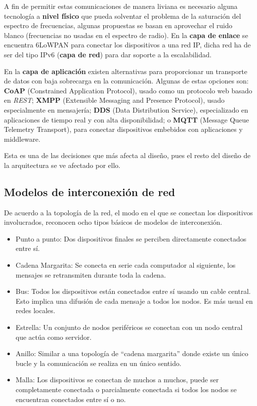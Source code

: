 \documentclass[a4paper,10pt]{article}
\begin{document}
A fin de permitir estas comunicaciones de manera liviana es necesario
alguna tecnología a \textbf{nivel físico} que pueda solventar el
problema de la saturación del espectro de frecuencias, algunas
propuestas se basan en aprovechar el ruido blanco (frecuencias no
usadas en el espectro de radio)\cite{tempertonTVWhiteSpace2015}.  En
la \textbf{capa de enlace} se encuentra 6LoWPAN
\cite{schumacherIPv6LowPowerWireless} para conectar los dispositivos a
una red IP, dicha red ha de ser del tipo IPv6 (\textbf{capa de red})
para dar soporte a la escalabilidad.

En la \textbf{capa de aplicación} existen alternativas para
proporcionar un transporte de datos con baja sobrecarga en la
comunicación. Algunas de estas opciones\cite{al-fuqahaInternetThingsSurvey2015}
son: \textbf{CoAP}
(Constrained Application Protocol), usado como un protocolo web basado
en \textit{REST}\cite{WebServicesArchitecture}; \textbf{XMPP}
(Extensible Messaging and Presence Protocol), usado especialmente en
mensajería; \textbf{DDS} (Data Distribution Service), especializado en
aplicaciones de tiempo real y con alta disponibilidad; o \textbf{MQTT}
(Message Queue Telemetry Transport), para conectar dispositivos
embebidos con aplicaciones y middleware.

Esta es una de las decisiones que más afecta al diseño, pues el resto
del diseño de la arquitectura se ve afectado por ello.

\subsection{Modelos de interconexión de
red}\label{modelos-de-interconexiuxf3n-de-red}

De acuerdo a la topología de la red, el modo en el que se conectan los
dispositivos involucrados, reconocen ocho tipos básicos de modelos de
interconexión\cite{bicsiNetworkDesignBasics2002}.

\begin{itemize}
\item{Punto a punto: Dos dispositivos finales se perciben directamente
  conectados entre sí.}
\item{Cadena Margarita: Se conecta en serie cada computador al
  siguiente, los mensajes se retransmiten durante toda la cadena.}
\item{Bus: Todos los dispositivos están conectados entre sí usando
  un cable central. Esto implica una difusión de cada mensaje a
  todos los nodos. Es más usual en redes locales.}
\item{Estrella: Un conjunto de nodos periféricos se conectan con un
  nodo central que actúa como servidor.}
\item{Anillo: Similar a una topología de “cadena margarita” donde
  existe un único bucle y la comunicación se realiza en un único
  sentido.}
\item{Malla: Los dispositivos se conectan de muchos a muchos, puede
  ser completamente conectada o parcialmente conectada si todos los
  nodos se encuentran conectados entre sí o no.}
\end{itemize}
\end{document}
